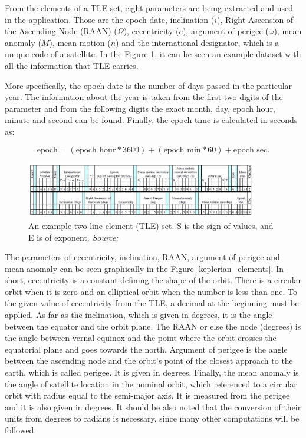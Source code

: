 From the elements of a TLE set, eight parameters are being extracted and used in the application. Those are the epoch date, inclination ($i$), Right Ascension of the Ascending Node (RAAN) ($\Omega$), eccentricity ($e$), argument of perigee ($\omega$), mean anomaly ($M$), mean motion ($n$) and the international designator, which is a unique code of a satellite. In the Figure \ref{tle}, it can be seen an example dataset with all the information that TLE carries.

More specifically, the epoch date is the number of days passed in the particular year. The information about the year is taken from the first two digits of the parameter and from the following digits the exact month, day, epoch hour, minute and second can be found. Finally, the epoch time is calculated in seconds as:

\begin{equation}
\label{epoch}
\text{epoch} = (\text{epoch hour} * 3600) + (\text{epoch min} * 60) + \text{epoch sec}.
\end{equation}

\begin{figure}
\centering
\includegraphics[width=0.9\textwidth]{Images/tle.png}\caption{An example two-line element (TLE) set. S is the sign of values, and E is of exponent. \textit{Source: \cite{Vallado}}}
\label{tle} 
\end{figure}

The parameters of eccentricity, inclination, RAAN, argument of perigee and mean anomaly can be seen graphically in the Figure \ref{keplerian_elements}. In short, eccentricity is a constant defining the shape of the orbit. There is a circular orbit when it is zero and an elliptical orbit when the number is less than one. To the given value of eccentricity from the TLE, a decimal at the beginning must be applied. As far as the inclination, which is given in degrees, it is the angle between the equator and the orbit plane. The RAAN or else the node (degrees) is the angle between vernal equinox and the point where the orbit crosses the equatorial plane and goes towards the north. Argument of perigee is the angle between the ascending node and the orbit's point of the closest approach to the earth, which is called perigee. It is given in degrees. Finally, the mean anomaly is the angle of satellite location in the nominal orbit, which referenced to a circular orbit with radius equal to the semi-major axis. It is measured from the perigee and it is also given in degrees. It should be also noted that the conversion of their units from degrees to radians is necessary, since many other computations will be followed. \cite{Vallado}

